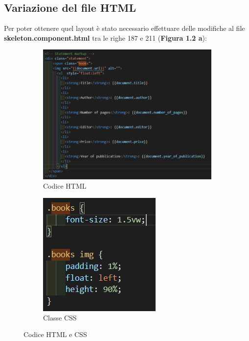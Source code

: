\documentclass[a4paper,11pt]{report}
\begin{document}
\subsection{Variazione del file HTML}
Per poter ottenere quel layout è stato necessario effettuare delle modifiche al file \textbf{skeleton.component.html} tra le righe 187 e 211 (\textbf{Figura 1.2 a}):
\begin{figure}[H]
	\begin{subfigure}{.60\textwidth}
		\centering
		\includegraphics[width=1\linewidth]{statement}
		\caption{Codice HTML}
		\label{fig:statement}
	\end{subfigure}%
	\begin{subfigure}{.20\textwidth}
		\centering
		\includegraphics[width=.9\linewidth]{css}
		\caption{Classe CSS}
		\label{fig:css}
	\end{subfigure}%
	\caption{Codice HTML e CSS}
	\label{fig: HTML and CSS }
\end{figure}
\end{document}
